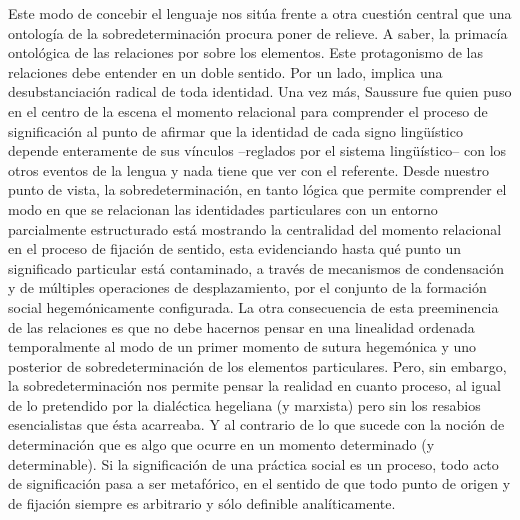 Este modo de concebir el lenguaje nos sitúa frente a otra cuestión central que una ontología de la sobredeterminación procura poner de relieve. A saber, la primacía ontológica de las relaciones por sobre los elementos. Este protagonismo de las relaciones debe entender en un doble sentido. Por un lado, implica una desubstanciación radical de toda identidad. Una vez más, Saussure fue quien puso en el centro de la escena el momento relacional para comprender el proceso de significación al punto de afirmar que la identidad de cada signo lingüístico depende enteramente de sus vínculos --reglados por el sistema lingüístico-- con los otros eventos de la lengua y nada tiene que ver con el referente. Desde nuestro punto de vista, la sobredeterminación, en tanto lógica que permite comprender el modo en que se relacionan las identidades particulares con un entorno parcialmente estructurado está mostrando la centralidad del momento relacional en el proceso de fijación de sentido, esta evidenciando hasta qué punto un significado particular está contaminado, a través de mecanismos de condensación y de múltiples operaciones de desplazamiento, por el conjunto de la formación social hegemónicamente configurada. La otra consecuencia de esta preeminencia de las relaciones es que no debe hacernos pensar en una linealidad ordenada temporalmente al modo de un primer momento de sutura hegemónica y uno posterior de sobredeterminación de los elementos particulares. Pero, sin embargo, la sobredeterminación nos permite pensar la realidad en cuanto proceso, al igual de lo pretendido por la dialéctica hegeliana (y marxista) pero sin los resabios esencialistas que ésta acarreaba. Y al contrario de lo que sucede con la noción de determinación que es algo que ocurre en un momento determinado (y determinable). Si la significación de una práctica social es un proceso, todo acto de significación pasa a ser metafórico, en el sentido de que todo punto de origen y de fijación siempre es arbitrario y sólo definible analíticamente.

